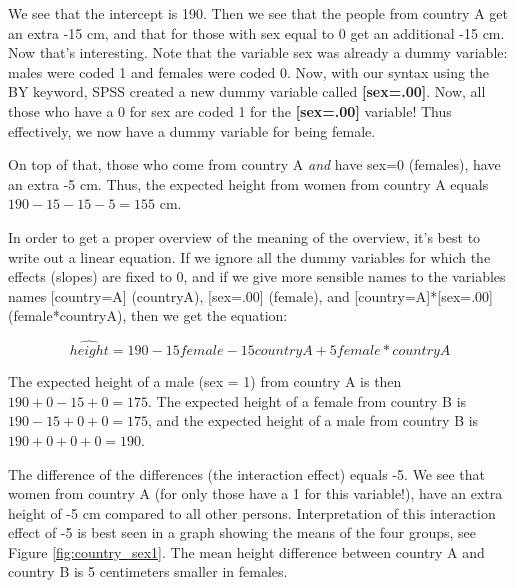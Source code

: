 \documentclass[]{report}\usepackage[]{graphicx}\usepackage[]{color}
\begin{document}
We see that the intercept is 190. Then we see that the people from country A get an extra -15 cm, and that for those with sex equal to 0 get an additional -15 cm. Now that's interesting. Note that the variable sex was already a dummy variable: males were coded 1 and females were coded 0. Now, with our syntax using the BY keyword, SPSS created a new dummy variable called \textbf{[sex=.00]}. Now, all those who have a 0 for sex are coded 1 for the \textbf{[sex=.00]} variable! Thus effectively, we now have a dummy variable for being female. 

On top of that, those who come from country A \textit{and} have sex=0 (females), have an extra -5 cm. Thus, the expected height from women from country A equals $190-15-15-5=155$ cm. 

In order to get a proper overview of the meaning of the overview, it's best to write out a linear equation. If we ignore all the dummy variables for which the effects (slopes) are fixed to 0, and if we give more sensible names to the variables names [country=A] (countryA), [sex=.00] (female), and [country=A]*[sex=.00] (female*countryA), then we get the equation:

\begin{equation}
\widehat{height}= 190  - 15 female - 15 countryA + 5 female*countryA
\end{equation}


The expected height of a male (sex = 1) from country A is then $190  + 0 - 15 + 0 = 175$. The expected height of a female from country B is $190 -15 + 0 +0 =175$, and the expected height of a male from country B is $190 + 0 + 0 + 0 = 190$. 

The difference of the differences (the interaction effect) equals -5. We see that women from country A (for only those have a 1 for this variable!), have an extra height of -5 cm compared to all other persons. Interpretation of this interaction effect of -5 is best seen in a graph showing the means of the four groups, see Figure \ref{fig:country_sex1}. The mean height difference between country A and country B is 5 centimeters smaller in females.
\end{document}
